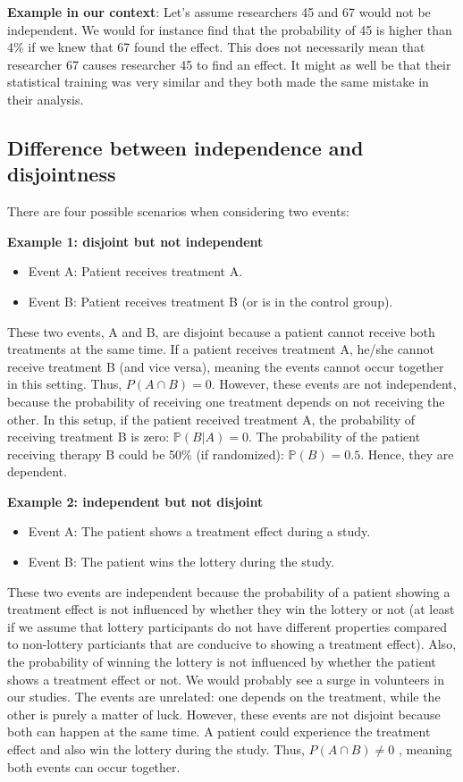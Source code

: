 \documentclass[
]{book}
\providecommand{\tightlist}{%
  \setlength{\itemsep}{0pt}\setlength{\parskip}{0pt}}
\begin{document}
\textbf{Example in our context}:
Let's assume researchers 45 and 67 would not be independent. We would for instance find that the probability of 45 is higher than 4\% if we knew that 67 found the effect.
This does not necessarily mean that researcher 67 causes researcher 45 to find an effect.
It might as well be that their statistical training was very similar and they both made the same mistake in
their analysis.

\subsection{Difference between independence and disjointness}\label{difference-between-independence-and-disjointness}

There are four possible scenarios when considering two events:

\textbf{Example 1: disjoint but not independent}

\begin{itemize}
\tightlist
\item
  Event A: Patient receives treatment A.
\item
  Event B: Patient receives treatment B (or is in the control group).
\end{itemize}

These two events, A and B, are disjoint because a patient cannot receive both treatments at the same time.
If a patient receives treatment A, he/she cannot receive treatment B (and vice versa), meaning the events cannot occur together in this setting. Thus, \(P(A \cap B) = 0\).
However, these events are not independent, because the probability of receiving one treatment depends on not receiving the other.
In this setup, if the patient received treatment A, the probability of receiving treatment B is zero: \(\mathbb{P}(B|A) = 0\).
The probability of the patient receiving therapy B could be 50\% (if randomized): \(\mathbb{P}(B) = 0.5\). Hence, they are dependent.

\textbf{Example 2: independent but not disjoint}

\begin{itemize}
\tightlist
\item
  Event A: The patient shows a treatment effect during a study.
\item
  Event B: The patient wins the lottery during the study.
\end{itemize}

These two events are independent because the probability of a patient showing a treatment effect is not influenced by whether they win the lottery or not
(at least if we assume that lottery participants do not have different properties compared to non-lottery particiants that are conducive to showing a treatment effect).
Also, the probability of winning the lottery is not influenced by whether the patient shows a treatment effect or not. We would probably see a surge
in volunteers in our studies.
The events are unrelated: one depends on the treatment, while the other is purely a matter of luck.
However, these events are not disjoint because both can happen at the same time.
A patient could experience the treatment effect and also win the lottery during the study. Thus, \(P(A \cap B) \neq 0\) , meaning both events can occur together.
\end{document}
